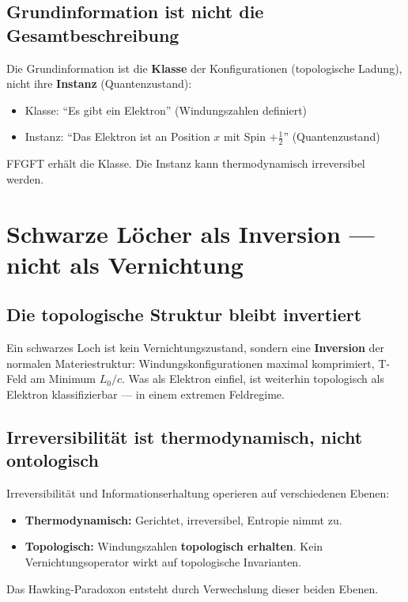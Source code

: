 \subsection{Grundinformation ist nicht die Gesamtbeschreibung}

Die Grundinformation ist die \textbf{Klasse} der Konfigurationen (topologische Ladung), nicht ihre \textbf{Instanz} (Quantenzustand):
\begin{itemize}
  \item Klasse: ``Es gibt ein Elektron'' (Windungszahlen definiert)
  \item Instanz: ``Das Elektron ist an Position $x$ mit Spin $+\frac{1}{2}$'' (Quantenzustand)
\end{itemize}
FFGFT erhält die Klasse. Die Instanz kann thermodynamisch irreversibel werden.

\section{Schwarze Löcher als Inversion --- nicht als Vernichtung}

\subsection{Die topologische Struktur bleibt invertiert}

Ein schwarzes Loch ist kein Vernichtungszustand, sondern eine \textbf{Inversion} der normalen Materiestruktur: Windungskonfigurationen maximal komprimiert, T-Feld am Minimum $L_0/c$. Was als Elektron einfiel, ist weiterhin topologisch als Elektron klassifizierbar --- in einem extremen Feldregime.

\subsection{Irreversibilität ist thermodynamisch, nicht ontologisch}

\begin{erkenntnis}
Irreversibilität und Informationserhaltung operieren auf verschiedenen Ebenen:
\begin{itemize}
  \item \textbf{Thermodynamisch:} Gerichtet, irreversibel, Entropie nimmt zu.
  \item \textbf{Topologisch:} Windungszahlen \textbf{topologisch erhalten}. Kein Vernichtungsoperator wirkt auf topologische Invarianten.
\end{itemize}
Das Hawking-Paradoxon entsteht durch Verwechslung dieser beiden Ebenen.
\end{erkenntnis}

